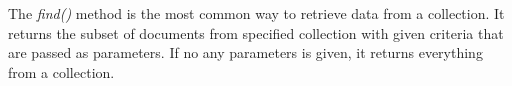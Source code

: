 The \textit{find()} method is the most common way to retrieve data from a collection. It returns the subset of documents from specified collection with given criteria that are passed as parameters. If no any parameters is given, it returns everything from a collection.  

\par
